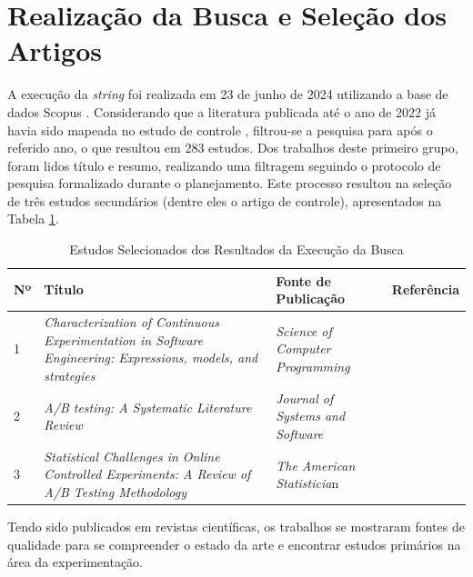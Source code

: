 \section{Realização da Busca e Seleção dos Artigos}

A execução da \textit{string} foi realizada em 23 de junho de 2024 utilizando a base de dados Scopus \cite{elsevier2022}. Considerando que a literatura publicada até o ano de 2022 já havia sido mapeada no estudo de controle \cite{erthal_characterization_2023}, filtrou-se a pesquisa para após o referido ano, o que resultou em 283 estudos. Dos trabalhos deste primeiro grupo, foram lidos título e resumo, realizando uma filtragem seguindo o protocolo de pesquisa formalizado durante o planejamento. Este processo resultou na seleção de três estudos secundários (dentre eles o artigo de controle), apresentados na Tabela \ref{tab:resultados-busca}.

\begin{table}[]
    \caption{Estudos Selecionados dos Resultados da Execução da Busca}

    \begin{tabular}{|p{.5cm}|p{6cm}|p{6cm}|p{1.75cm}|}
        \hline
        Nº & Título & Fonte de Publicação & Referência \\ \hline
        1 & \textit{Characterization of Continuous Experimentation in Software Engineering: Expressions, models, and strategies} & \textit{Science of Computer Programming} & \cite{erthal_characterization_2023} \\ \hline
        2 & \textit{A/B testing: A Systematic Literature Review} & \textit{Journal of Systems and Software} & \cite{quin_b_2024} \\ \hline
        3 & \textit{Statistical Challenges in Online Controlled Experiments: A Review of A/B Testing Methodology} & \textit{The American Statisticia}n & \cite{larsen_statistical_2024} \\ \hline
    \end{tabular}
    
    \begin{center}
    \end{center}

    \label{tab:resultados-busca}
\end{table}

Tendo sido publicados em revistas científicas, os trabalhos se mostraram fontes de qualidade para se compreender o estado da arte e encontrar estudos primários na área da experimentação.


